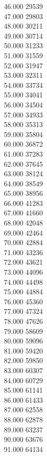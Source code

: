 { 46.000	29539 \\
 47.000	29803 \\
 48.000	30211 \\
 49.000	30714 \\
 50.000	31233 \\
 51.000	31559 \\
 52.000	31947 \\
 53.000	32311 \\
 54.000	33734 \\
 55.000	34041 \\
 56.000	34504 \\
 57.000	34933 \\
 58.000	35313 \\
 59.000	35804 \\
 60.000	36872 \\
 61.000	37283 \\
 62.000	37645 \\
 63.000	38124 \\
 64.000	38549 \\
 65.000	38956 \\
 66.000	41283 \\
 67.000	41660 \\
 68.000	42048 \\
 69.000	42464 \\
 70.000	42884 \\
 71.000	43236 \\
 72.000	43621 \\
 73.000	44096 \\
 74.000	44498 \\
 75.000	44884 \\
 76.000	45360 \\
 77.000	47324 \\
 78.000	47626 \\
 79.000	58609 \\
 80.000	59096 \\
 81.000	59420 \\
 82.000	59850 \\
 83.000	60307 \\
 84.000	60729 \\
 85.000	61141 \\
 86.000	61433 \\
 87.000	62558 \\
 88.000	62878 \\
 89.000	63237 \\
 90.000	63676 \\
 91.000	64134 \\
}
